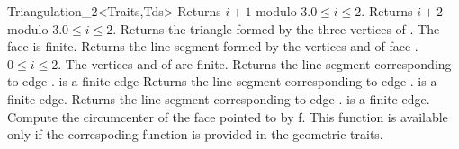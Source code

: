 \begin{ccClassTemplate}{Triangulation_2<Traits,Tds>}
{Returns $i+1$ modulo 3.\ccPrecond $0\leq i \leq 2$.}
\ccGlue
{}
{Returns $i+2$ modulo 3.\ccPrecond $0\leq i \leq 2$.}
\ccGlue
{}
{Returns the triangle formed by the three vertices of .
 \ccPrecond The face is finite.}
\ccGlue
{}
{Returns the line segment formed by the vertices 
 and  of face .
\ccPrecond $0\leq i \leq 2$. The vertices 
 and  of  
 are finite.}
\ccGlue
{}
{Returns the line segment corresponding to edge .
\ccPrecond {} is a finite edge}
\ccGlue
{}
{Returns the line segment corresponding to edge .
\ccPrecond {} is a finite edge.}
\ccGlue
{}
{Returns the line segment corresponding to edge .
\ccPrecond {} is a finite edge.}
\ccGlue
{}
{Compute the circumcenter of the face pointed to by f. This function
is available only if the correspoding function is provided in the
geometric traits.}








\end{ccClassTemplate}
